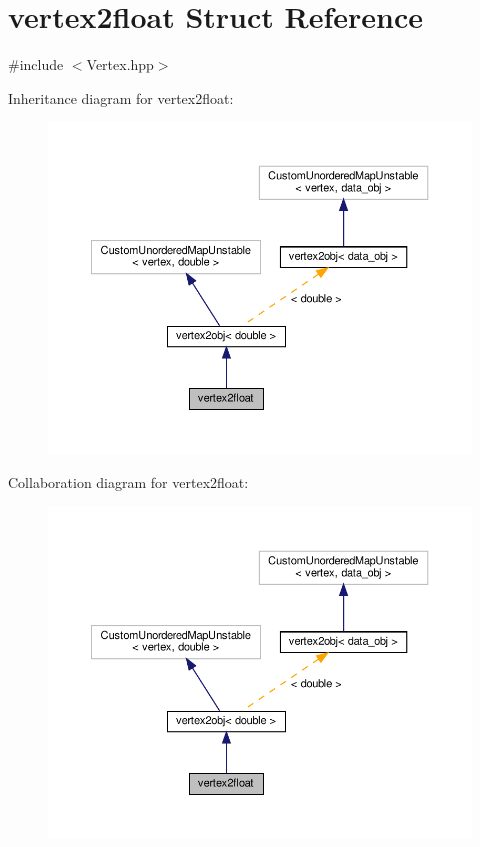 \hypertarget{structvertex2float}{}\section{vertex2float Struct Reference}
\label{structvertex2float}


{\ttfamily \#include $<$Vertex.\+hpp$>$}



Inheritance diagram for vertex2float\+:
\nopagebreak
\begin{figure}[H]
\begin{center}
\leavevmode
\includegraphics[width=350pt]{d9/df4/structvertex2float__inherit__graph}
\end{center}
\end{figure}


Collaboration diagram for vertex2float\+:
\nopagebreak
\begin{figure}[H]
\begin{center}
\leavevmode
\includegraphics[width=350pt]{d8/dc2/structvertex2float__coll__graph}
\end{center}
\end{figure}
